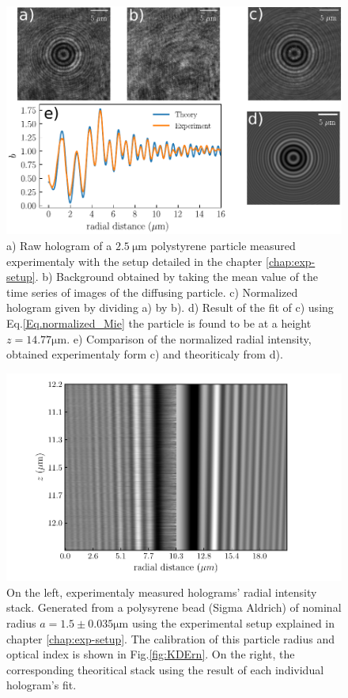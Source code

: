 \begin{figure}
	\centering
		\includegraphics[scale=0.8]{02_body/chapter2/images/lorenz_mie_fit_demo/plot_lorenz_mie.pdf}
		\caption{a) Raw hologram of a $2.5 ~ \mathrm{\mu m}$ polystyrene particle measured experimentaly with the setup detailed in the chapter \ref{chap:exp-setup}. b) Background obtained by taking the mean value of the time series of images of the diffusing particle. c) Normalized hologram given by dividing a) by b). d) Result of the fit of c) using Eq.{\ref{Eq.normalized_Mie}} the particle is found to be at a height $z = 14.77 \mathrm{\mu m}$. e) Comparison of the normalized radial intensity, obtained experimentaly form c) and theoriticaly from d).}
		\label{fig.Lorenz_mie_demo}
\end{figure}


\begin{figure}
	\centering
	\includegraphics{02_body/chapter2/images/test_tableau2.pdf}
	\caption{On the left, experimentaly measured  holograms' radial intensity stack. Generated from a polysyrene bead (Sigma Aldrich) of nominal radius $a = 1.5 \pm 0.035 \mathrm{\mu m} $ using the experimental setup explained in chapter \ref{chap:exp-setup}. The calibration of this particle radius and optical index is shown in Fig.\ref{fig:KDErn}. On the right, the corresponding theoritical stack using the result of each individual hologram's fit.}
\end{figure}


